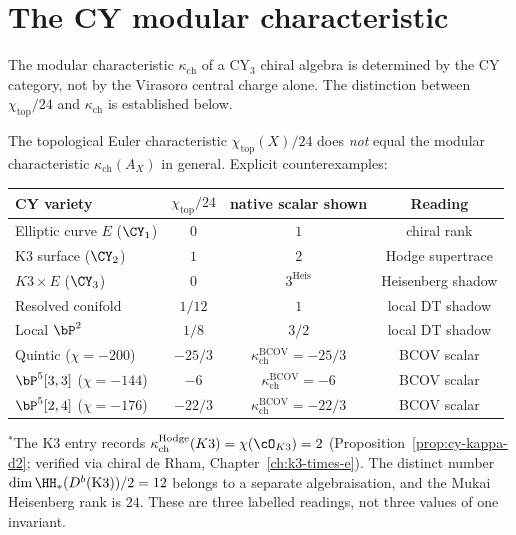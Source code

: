 \section{The CY modular characteristic}
\label{sec:cy-modular-char}

The modular characteristic $\kappa_{\mathrm{ch}}$ of a CY$_3$ chiral algebra is determined by the CY category, not by the Virasoro central charge alone. The distinction between $\chi_{\mathrm{top}}/24$ and $\kappa_{\mathrm{ch}}$ is established below.

\begin{theorem}[\texorpdfstring{$\chi_{\mathrm{top}}/24 \neq \kappa_{\mathrm{ch}}$}{chi-top/24 != kappa-ch} in general]
\label{thm:chi-neq-kappa}
The topological Euler characteristic $\chi_{\mathrm{top}}(X)/24$ does \emph{not} equal the modular characteristic $\kappa_{\mathrm{ch}}(A_X)$ in general. Explicit counterexamples:
\begin{center}
\renewcommand{\arraystretch}{1.2}
\begin{tabular}{lccc}
 \toprule
 \textbf{CY variety} & $\chi_{\mathrm{top}}/24$ & \textbf{native scalar shown} & \textbf{Reading} \\
 \midrule
 Elliptic curve $E$ ($\CY_1$) & $0$ & $1$ & chiral rank \\
 K3 surface ($\CY_2$) & $1$ & $2$\rlap{$^*$} & Hodge supertrace \\
 $K3 \times E$ ($\CY_3$) & $0$ & $3^{\mathrm{Heis}}$\rlap{$^\dagger$} & Heisenberg shadow \\
 Resolved conifold & $1/12$ & $1$ & local DT shadow \\
 Local $\bP^2$ & $1/8$ & $3/2$ & local DT shadow \\
 \midrule
 Quintic ($\chi = -200$) & $-25/3$ & $\kappa_{\mathrm{ch}}^{\mathrm{BCOV}}=-25/3$ & BCOV scalar \\
 $\bP^5[3,3]$ ($\chi = -144$) & $-6$ & $\kappa_{\mathrm{ch}}^{\mathrm{BCOV}}=-6$ & BCOV scalar \\
 $\bP^5[2,4]$ ($\chi = -176$) & $-22/3$ & $\kappa_{\mathrm{ch}}^{\mathrm{BCOV}}=-22/3$ & BCOV scalar \\
 \bottomrule
\end{tabular}
\end{center}
{\footnotesize $^*$The K3 entry records \(\kappa_{\mathrm{ch}}^{\mathrm{Hodge}}(K3)=\chi(\cO_{K3})=2\) (Proposition~\ref{prop:cy-kappa-d2}; verified via chiral de Rham, Chapter~\ref{ch:k3-times-e}). The distinct number \(\dim \HH_*(D^b(\mathrm{K3}))/2=12\) belongs to a separate algebraisation, and the Mukai Heisenberg rank is \(24\). These are three labelled readings, not three values of one invariant.

}
\end{theorem}
